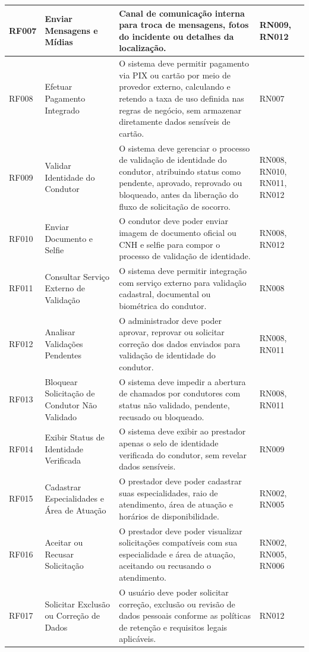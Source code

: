 \documentclass[12pt, a4paper]{article}
\begin{document}
{\begin{longtable}{|>{\raggedright\arraybackslash}p{}|>{\raggedright\arraybackslash}p{}|>{\raggedright\arraybackslash}p{}|>{\raggedright\arraybackslash}p{}|}
RF007 & Enviar Mensagens e Mídias & Canal de comunicação interna para troca de mensagens, fotos do incidente ou detalhes da localização. & RN009, RN012 \\ \hline
RF008 & Efetuar Pagamento Integrado & O sistema deve permitir pagamento via PIX ou cartão por meio de provedor externo, calculando e retendo a taxa de uso definida nas regras de negócio, sem armazenar diretamente dados sensíveis de cartão. & RN007 \\ \hline
RF009 & Validar Identidade do Condutor & O sistema deve gerenciar o processo de validação de identidade do condutor, atribuindo status como pendente, aprovado, reprovado ou bloqueado, antes da liberação do fluxo de solicitação de socorro. & RN008, RN010, RN011, RN012 \\ \hline
RF010 & Enviar Documento e Selfie & O condutor deve poder enviar imagem de documento oficial ou CNH e selfie para compor o processo de validação de identidade. & RN008, RN012 \\ \hline
RF011 & Consultar Serviço Externo de Validação & O sistema deve permitir integração com serviço externo para validação cadastral, documental ou biométrica do condutor. & RN008 \\ \hline
RF012 & Analisar Validações Pendentes & O administrador deve poder aprovar, reprovar ou solicitar correção dos dados enviados para validação de identidade do condutor. & RN008, RN011 \\ \hline
RF013 & Bloquear Solicitação de Condutor Não Validado & O sistema deve impedir a abertura de chamados por condutores com status não validado, pendente, recusado ou bloqueado. & RN008, RN011 \\ \hline
RF014 & Exibir Status de Identidade Verificada & O sistema deve exibir ao prestador apenas o selo de identidade verificada do condutor, sem revelar dados sensíveis. & RN009 \\ \hline
RF015 & Cadastrar Especialidades e Área de Atuação & O prestador deve poder cadastrar suas especialidades, raio de atendimento, área de atuação e horários de disponibilidade. & RN002, RN005 \\ \hline
RF016 & Aceitar ou Recusar Solicitação & O prestador deve poder visualizar solicitações compatíveis com sua especialidade e área de atuação, aceitando ou recusando o atendimento. & RN002, RN005, RN006 \\ \hline
RF017 & Solicitar Exclusão ou Correção de Dados & O usuário deve poder solicitar correção, exclusão ou revisão de dados pessoais conforme as políticas de retenção e requisitos legais aplicáveis. & RN012 \\ \hline

\end{longtable}}
\end{document}
